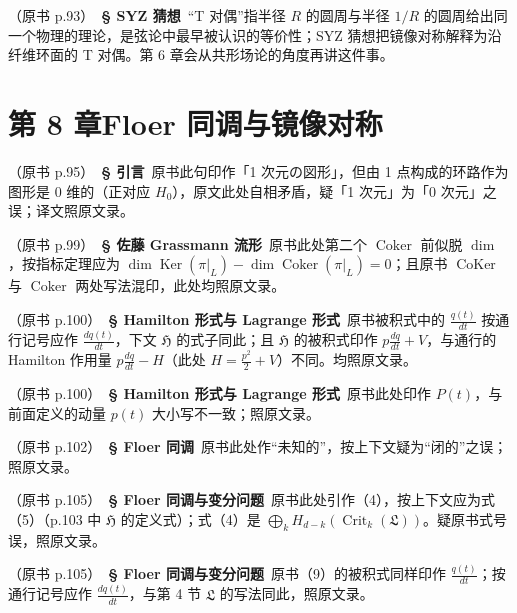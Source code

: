 \noindent （原书 p.93）\ \textbf{§ SYZ 猜想}\ “T 对偶”指半径 $R$ 的圆周与半径 $1/R$ 的圆周给出同一个物理的理论，是弦论中最早被认识的等价性；SYZ 猜想把镜像对称解释为沿纤维环面的 T 对偶。第 6 章会从共形场论的角度再讲这件事。\par\smallskip

\section*{第 8 章\quad Floer 同调与镜像对称}

\noindent （原书 p.95）\ \textbf{§ 引言}\ 原书此句印作「1 次元の図形」，但由 1 点构成的环路作为图形是 0 维的（正对应 $H_0$），原文此处自相矛盾，疑「1 次元」为「0 次元」之误；译文照原文录。\par\smallskip

\noindent （原书 p.99）\ \textbf{§ 佐藤 Grassmann 流形}\ 原书此处第二个 $\operatorname{Coker}$ 前似脱 $\dim$，按指标定理应为 $\dim\operatorname{Ker}(\pi|_L)-\dim\operatorname{Coker}(\pi|_L)=0$；且原书 $\operatorname{CoKer}$ 与 $\operatorname{Coker}$ 两处写法混印，此处均照原文录。\par\smallskip

\noindent （原书 p.100）\ \textbf{§ Hamilton 形式与 Lagrange 形式}\ 原书被积式中的 $\frac{q(t)}{dt}$ 按通行记号应作 $\frac{dq(t)}{dt}$，下文 $\mathfrak{H}$ 的式子同此；且 $\mathfrak{H}$ 的被积式印作 $p\frac{dq}{dt}+V$，与通行的 Hamilton 作用量 $p\frac{dq}{dt}-H$（此处 $H=\frac{p^{2}}{2}+V$）不同。均照原文录。\par\smallskip

\noindent （原书 p.100）\ \textbf{§ Hamilton 形式与 Lagrange 形式}\ 原书此处印作 $P(t)$，与前面定义的动量 $p(t)$ 大小写不一致；照原文录。\par\smallskip

\noindent （原书 p.102）\ \textbf{§ Floer 同调}\ 原书此处作“未知的”，按上下文疑为“闭的”之误；照原文录。\par\smallskip

\noindent （原书 p.105）\ \textbf{§ Floer 同调与变分问题}\ 原书此处引作（4），按上下文应为式（5）（p.103 中 $\mathfrak{H}$ 的定义式）；式（4）是 $\bigoplus_{k}H_{d-k}(\operatorname{Crit}_k(\mathfrak{L}))$。疑原书式号误，照原文录。\par\smallskip

\noindent （原书 p.105）\ \textbf{§ Floer 同调与变分问题}\ 原书（9）的被积式同样印作 $\frac{q(t)}{dt}$；按通行记号应作 $\frac{dq(t)}{dt}$，与第 4 节 $\mathfrak{L}$ 的写法同此，照原文录。\par\smallskip

